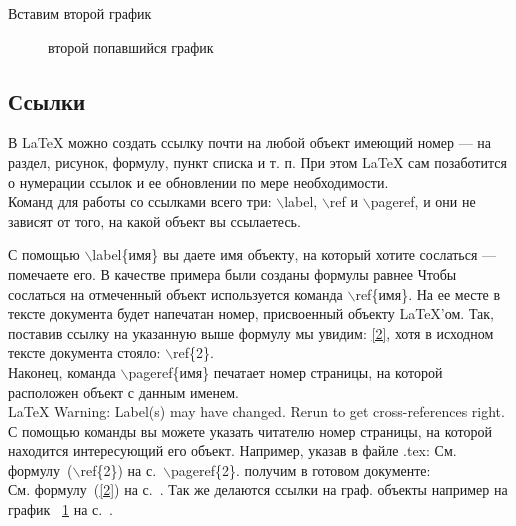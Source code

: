 \documentclass[a4paper,14pt,oneside]{book}
\theoremstyle{plain} %
\theoremstyle{definition} %
\theoremstyle{remark} %
\begin{document}
Вставим второй  график
\begin{figure}
\caption{второй  попавшийся график}
\label{fig:2}
\end{figure}
\subsection{Ссылки}

В LaTeX можно создать ссылку почти на любой объект имеющий номер --- на раздел, рисунок, формулу, пункт списка и т. п. При этом LaTeX сам позаботится о нумерации ссылок и ее обновлении по мере необходимости.\\
Команд для работы со ссылками всего три: $\backslash$label, $\backslash$ref и $\backslash$pageref, и они не зависят от того, на какой объект вы ссылаетесь.

С помощью $\backslash$label\{имя\} вы даете имя объекту, на который хотите сослаться --- помечаете его. В качестве примера были созданы формулы равнее
Чтобы сослаться на отмеченный объект используется команда $\backslash$ref\{имя\}. На ее месте в тексте документа будет напечатан номер, присвоенный объекту LaTeX'ом. Так, поставив ссылку на указанную выше формулу мы увидим: \ref{2}, хотя в исходном тексте документа стояло: $\backslash$ref\{2\}.\\
Наконец, команда $\backslash$pageref\{имя\} печатает номер страницы, на которой расположен объект с данным именем.\\
LaTeX Warning: Label(s) may have changed. Rerun to get cross-references right.
С помощью команды \pageref вы можете указать читателю номер страницы, на которой находится интересующий его объект. Например, указав в файле .tex:
См. формулу~($\backslash$ref\{2\}) на с.~$\backslash$pageref\{2\}.
получим в готовом документе:\\
См. формулу~(\ref{2}) на с.~\pageref{2}.
Так же делаются ссылки на граф. объекты например на график ~\ref{fig:2} на с.~\pageref{fig:2}.
\end{document}
